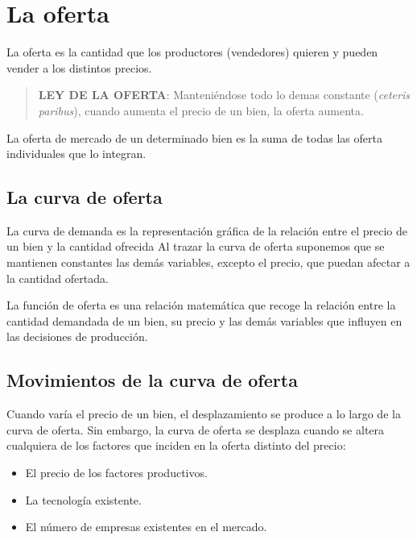 \documentclass[
]{krantz}
\providecommand{\tightlist}{%
  \setlength{\itemsep}{0pt}\setlength{\parskip}{0pt}}
\begin{document}
\hypertarget{la-oferta}{%
\section{La oferta}\label{la-oferta}}

La oferta es la cantidad que los productores (vendedores) quieren y pueden vender a los distintos precios.

\begin{quote}
\textbf{LEY DE LA OFERTA}:
Manteniéndose todo lo demas constante (\emph{ceteris paribus}), cuando aumenta el precio de un bien, la oferta aumenta.
\end{quote}

La oferta de mercado de un determinado bien es la suma de todas las oferta individuales que lo integran.

\hypertarget{la-curva-de-oferta}{%
\subsection{La curva de oferta}\label{la-curva-de-oferta}}

La curva de demanda es la representación gráfica de la relación entre el precio de un bien y la cantidad ofrecida Al trazar la curva de oferta suponemos que se mantienen constantes las demás variables, excepto el precio, que puedan afectar a la cantidad ofertada.

La función de oferta es una relación matemática que recoge la relación entre la cantidad demandada de un bien, su precio y las demás variables que influyen en las decisiones de producción.

\hypertarget{movimientos-de-la-curva-de-oferta}{%
\subsection{Movimientos de la curva de oferta}\label{movimientos-de-la-curva-de-oferta}}

Cuando varía el precio de un bien, el desplazamiento se produce a lo largo de la curva de oferta. Sin embargo, la curva de oferta se desplaza cuando se altera cualquiera de los factores que inciden en la oferta distinto del precio:

\begin{itemize}
\tightlist
\item
  El precio de los factores productivos.
\item
  La tecnología existente.
\item
  El número de empresas existentes en el mercado.
\end{itemize}
\end{document}
